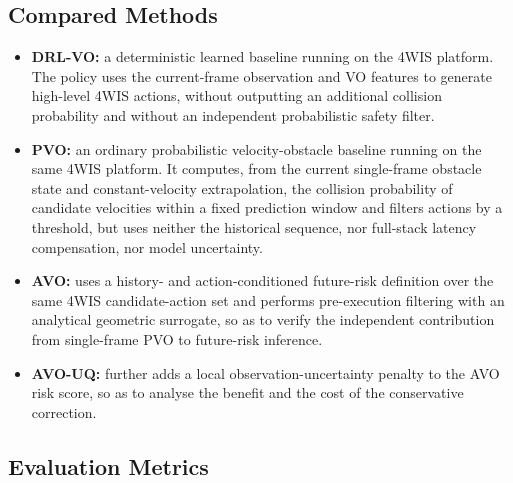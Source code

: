 \documentclass[10pt,a4paper,twocolumn]{article}
\begin{document}
\subsection{Compared Methods}

\begin{itemize}
    \item \textbf{DRL-VO:} a deterministic learned baseline running on the 4WIS platform. The policy uses the current-frame observation and VO features to generate high-level 4WIS actions, without outputting an additional collision probability and without an independent probabilistic safety filter.
    \item \textbf{PVO:} an ordinary probabilistic velocity-obstacle baseline running on the same 4WIS platform. It computes, from the current single-frame obstacle state and constant-velocity extrapolation, the collision probability of candidate velocities within a fixed prediction window and filters actions by a threshold, but uses neither the historical sequence, nor full-stack latency compensation, nor model uncertainty.
    \item \textbf{AVO:} uses a history- and action-conditioned future-risk definition over the same 4WIS candidate-action set and performs pre-execution filtering with an analytical geometric surrogate, so as to verify the independent contribution from single-frame PVO to future-risk inference.
    \item \textbf{AVO-UQ:} further adds a local observation-uncertainty penalty to the AVO risk score, so as to analyse the benefit and the cost of the conservative correction.
\end{itemize}

\subsection{Evaluation Metrics}
\end{document}
